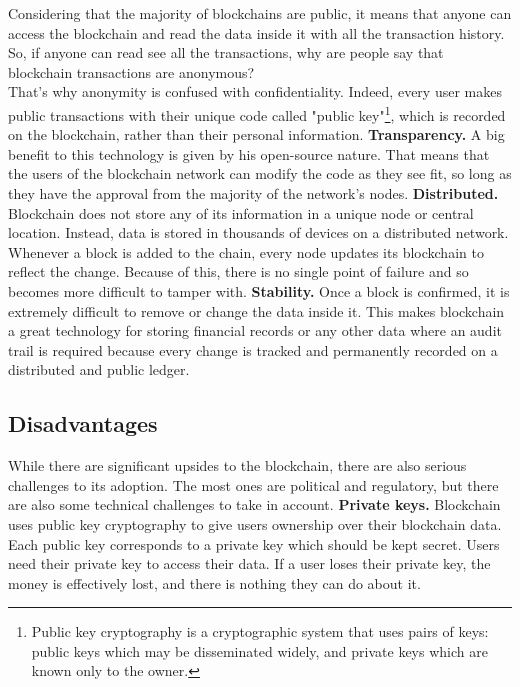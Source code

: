 Considering that the majority of blockchains are public, it means that anyone 
can access the blockchain and read the data inside it with all the transaction 
history. So, if anyone can read see all the transactions, why are people say that
blockchain transactions are anonymous?\\
That’s why anonymity is confused with confidentiality. Indeed, every user makes 
public transactions with their unique code called "public key"\footnote{Public key cryptography is a cryptographic system that uses pairs of keys: public keys which may be disseminated widely, and private keys which are known only to the owner.},
which is recorded on the blockchain, rather than their personal information.\cite{investopedia}\pagebreak
\bigskip 
\textbf{Transparency.}
A big benefit to this technology is given by his open-source nature. That means
that the users of the blockchain network can modify the code as they see fit, so long
as they have the approval from the majority of the network's nodes.
\bigskip 
\textbf{Distributed.}
Blockchain does not store any of its information in a unique node or central 
location. Instead, data is stored in thousands of devices on a distributed
network. Whenever a block is added to the chain, every node updates its blockchain
to reflect the change. Because of this, there is no single point of failure
and so becomes more difficult to tamper with.\cite{binancevision}\cite{investopedia}
\bigskip 
\textbf{Stability.}
Once a block is confirmed, it is extremely difficult to remove or change the data inside it.
This makes blockchain a great technology for storing financial records or any other data 
where an audit trail is required because every change is tracked and permanently recorded 
on a distributed and public ledger.\cite{binancevision}
\bigskip

\subsection{Disadvantages}
\label{sec:disadvantages}

While there are significant upsides to the blockchain, there are also serious 
challenges to its adoption. The most ones are political and regulatory, but 
there are also some technical challenges to take in account.
\bigskip 
\textbf{Private keys.} 
Blockchain uses public key cryptography to give users ownership over their blockchain data.
Each public key corresponds to a private key which should be kept secret. Users need their 
private key to access their data. If a user loses their private key, the money is 
effectively lost, and there is nothing they can do about it.\cite{binancevision}\\

